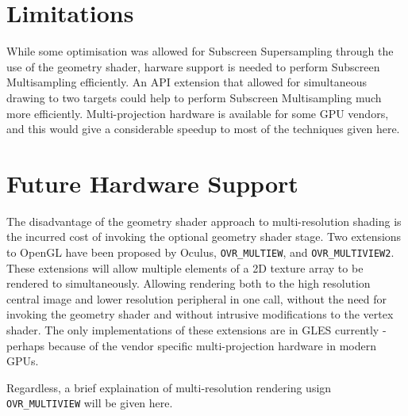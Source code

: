 \documentclass[12pt,a4paper,twoside,openright]{report}
\begin{document}
\section{Limitations}

While some optimisation was allowed for Subscreen Supersampling through the use of the geometry shader, harware support is needed to perform Subscreen Multisampling efficiently.
An API extension that allowed for simultaneous drawing to two targets could help to perform Subscreen Multisampling much more efficiently.
Multi-projection hardware is available for some GPU vendors, and this would give a considerable speedup to most of the techniques given here. 

\section{Future Hardware Support}

The disadvantage of the geometry shader approach to multi-resolution shading is the incurred cost of invoking the optional geometry shader stage.
Two extensions to OpenGL have been proposed by Oculus, \texttt{OVR\_MULTIEW}, and \texttt{OVR\_MULTIVIEW2}. These extensions will allow multiple elements of a 2D texture array to be rendered to simultaneously. Allowing rendering both to the high resolution central image and lower resolution peripheral in one call, without the need for invoking the geometry shader and without intrusive modifications to the vertex shader. The only implementations of these extensions are in GLES currently - perhaps because of the vendor specific multi-projection hardware in modern GPUs.

Regardless, a brief explaination of multi-resolution rendering usign \texttt{OVR\_MULTIVIEW} will be given here.
\end{document}

